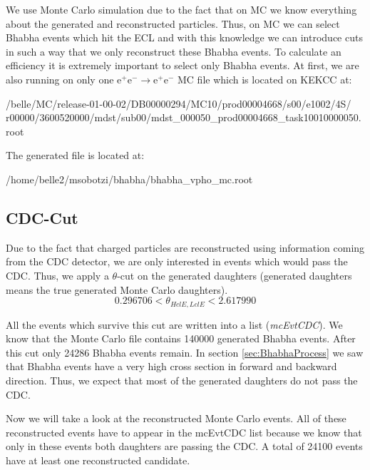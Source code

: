 \documentclass[a4paper,11pt,twosided,final,german,openbib,pdftex,listof=totoc,bibliography=totoc]{scrbook}
\begin{document}
We use Monte Carlo simulation due to the fact that on MC we know everything about the generated and reconstructed particles. Thus, on MC we can select Bhabha events which hit the ECL and with this knowledge we can introduce cuts in such a way that we only reconstruct these Bhabha events. To calculate an efficiency it is extremely  important to select only Bhabha events. At first, we are also running on only one $\textrm{e}^+ \textrm{e}^- \rightarrow \textrm{e}^+ \textrm{e}^-$ MC file which is located on KEKCC at:
\newline

/belle/MC/release-01-00-02/DB00000294/MC10/prod00004668/s00/e1002/4S/
r00000/3600520000/mdst/sub00/mdst\_000050\_prod00004668\_task10010000050.root
\newline

The generated file is located at:

 /home/belle2/msobotzi/bhabha/bhabha\_vpho\_mc.root
\newline


\subsection{CDC-Cut}

Due to the fact that charged particles are reconstructed using information coming from the CDC detector, we are only interested in events which would pass the CDC. Thus, we apply a $\theta$-cut on the generated daughters (generated daughters means the true generated Monte Carlo daughters). 
\begin{equation}
	0.296706 < \theta_{HclE,LclE} < 2.617990
\end{equation}

All the events which survive this cut are written into a list (\textit{mcEvtCDC}). We know that the Monte Carlo file contains 140000 generated Bhabha events. After this cut only 24286 Bhabha events remain.
In section \ref{sec:BhabhaProcess} we saw that Bhabha events have a very high cross section in forward and backward  direction. Thus, we expect that most of the generated daughters do not pass the CDC. 
\newline

Now we will take a look at the reconstructed Monte Carlo events. All of these reconstructed events have to appear in the mcEvtCDC list because we know that only in these events both daughters are passing the CDC. A total of 24100 events have at least one reconstructed candidate.
\end{document}
